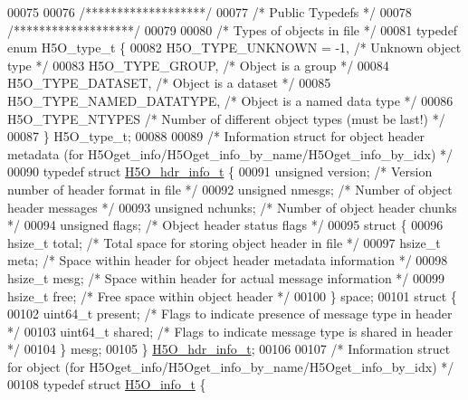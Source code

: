 \begin{DoxyCode}
00075 
00076 \textcolor{comment}{/*******************/}
00077 \textcolor{comment}{/* Public Typedefs */}
00078 \textcolor{comment}{/*******************/}
00079 
00080 \textcolor{comment}{/* Types of objects in file */}
00081 \textcolor{keyword}{typedef} \textcolor{keyword}{enum} H5O\_type\_t \{
00082     H5O\_TYPE\_UNKNOWN = -1,  \textcolor{comment}{/* Unknown object type      */}
00083     H5O\_TYPE\_GROUP,         \textcolor{comment}{/* Object is a group        */}
00084     H5O\_TYPE\_DATASET,       \textcolor{comment}{/* Object is a dataset      */}
00085     H5O\_TYPE\_NAMED\_DATATYPE,    \textcolor{comment}{/* Object is a named data type  */}
00086     H5O\_TYPE\_NTYPES             \textcolor{comment}{/* Number of different object types (must be last!) */}
00087 \} H5O\_type\_t;
00088 
00089 \textcolor{comment}{/* Information struct for object header metadata (for H5Oget\_info/H5Oget\_info\_by\_name/H5Oget\_info\_by\_idx) 
      */}
00090 \textcolor{keyword}{typedef} \textcolor{keyword}{struct }\hyperlink{struct_h5_o__hdr__info__t}{H5O\_hdr\_info\_t} \{
00091     \textcolor{keywordtype}{unsigned} version;       \textcolor{comment}{/* Version number of header format in file */}
00092     \textcolor{keywordtype}{unsigned} nmesgs;        \textcolor{comment}{/* Number of object header messages */}
00093     \textcolor{keywordtype}{unsigned} nchunks;       \textcolor{comment}{/* Number of object header chunks */}
00094     \textcolor{keywordtype}{unsigned} flags;             \textcolor{comment}{/* Object header status flags */}
00095     \textcolor{keyword}{struct }\{
00096         hsize\_t total;      \textcolor{comment}{/* Total space for storing object header in file */}
00097         hsize\_t meta;       \textcolor{comment}{/* Space within header for object header metadata information */}
00098         hsize\_t mesg;       \textcolor{comment}{/* Space within header for actual message information */}
00099         hsize\_t free;       \textcolor{comment}{/* Free space within object header */}
00100     \} space;
00101     \textcolor{keyword}{struct }\{
00102         uint64\_t present;   \textcolor{comment}{/* Flags to indicate presence of message type in header */}
00103         uint64\_t shared;    \textcolor{comment}{/* Flags to indicate message type is shared in header */}
00104     \} mesg;
00105 \} \hyperlink{struct_h5_o__hdr__info__t}{H5O\_hdr\_info\_t};
00106 
00107 \textcolor{comment}{/* Information struct for object (for H5Oget\_info/H5Oget\_info\_by\_name/H5Oget\_info\_by\_idx) */}
00108 \textcolor{keyword}{typedef} \textcolor{keyword}{struct }\hyperlink{struct_h5_o__info__t}{H5O\_info\_t} \{

\end{DoxyCode}
